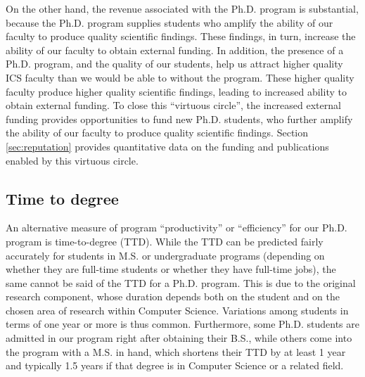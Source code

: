 \documentclass[12pt]{article}
\begin{document}
On the other hand, the revenue associated with the Ph.D. program is
substantial, because the Ph.D. program supplies students who amplify the
ability of our faculty to produce quality scientific findings.  These
findings, in turn, increase the ability of our faculty to obtain external
funding.  In addition, the presence of a Ph.D. program, and the quality of
our students, help us attract higher quality ICS faculty than we would be
able to without the program.  These higher quality faculty produce higher
quality scientific findings, leading to increased ability to obtain
external funding.  To close this ``virtuous circle'', the increased
external funding provides opportunities to fund new Ph.D. students, who
further amplify the ability of our faculty to produce quality scientific
findings.  Section \ref{sec:reputation} provides quantitative data on the
funding and publications enabled by this virtuous circle.


\subsection{Time to degree}

An alternative measure of program ``productivity'' or ``efficiency'' for
our Ph.D. program is time-to-degree (TTD).  While the TTD can be predicted
fairly accurately for students in M.S. or undergraduate programs (depending
on whether they are full-time students or whether they have full-time
jobs), the same cannot be said of the TTD for a Ph.D. program. This is due
to the original research component, whose duration depends both on the
student and on the chosen area of research within Computer
Science. Variations among students in terms of one year or more is thus
common. Furthermore, some Ph.D.  students are admitted in our program right
after obtaining their B.S., while others come into the program with a
M.S. in hand, which shortens their TTD by at least 1 year and typically 1.5
years if that degree is in Computer Science or a related field.
\end{document}
